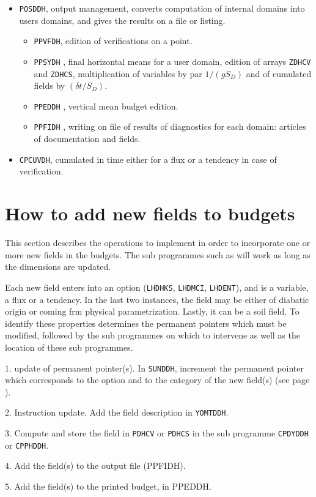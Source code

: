 \begin{itemize}
        \item {\tt POSDDH}, output management, converts computation of internal domains  into users domains, and gives the results on a file or listing.
            \begin{itemize}
                  \item {\tt PPVFDH}, edition of verifications on a point. 
                  \item {\tt PPSYDH} , final horizontal means for a user domain, edition of arrays {\tt ZDHCV} and {\tt ZDHCS}, multiplication of variables by par $1/(g S_{D})$ and of cumulated fields by $(\delta t/S_{D})$.
                  \item {\tt PPEDDH} , vertical mean budget edition.
                  \item {\tt PPFIDH} , writing on file of results of
                  diagnostics for each domain: articles of documentation and fields.
           \end{itemize}
\item {\tt CPCUVDH}, cumulated in time either for a flux or a tendency in case of verification.
\end{itemize}
\newpage

\section{How to add new fields to budgets}
This section describes the operations to implement in order to incorporate one or more new fields in the budgets. The sub programmes such as  will work as long as the dimensions are updated.

Each new field enters into an option ({\tt LHDHKS}, {\tt LHDMCI}, {\tt LHDENT}), and is a variable, a flux or a tendency. In the last two instances, the field may be either of diabatic origin or coming frm physical parametrization. Lastly, it can be a soil field. To identify these properties determines the permanent pointers which must be modified, followed by the sub programmes on which to intervene as well as the location of these sub programmes. 
\begin{description}
	\item{1. } update of permanent pointer(s). In {\tt SUNDDH}, increment the
	permanent pointer which corresponds to the option and to the category of the
	new field(s) (see page \pageref{poil}).
	\item{2. } Instruction update.
	Add the field description in {\tt YOMTDDH}.
	 \item{3.} Compute and store the field in {\tt PDHCV} or {\tt PDHCS} in the
	 sub programme {\tt CPDYDDH} or {\tt CPPHDDH}.
	\item{4. } Add the field(s) to the output file (PPFIDH).
	\item{5.} Add the field(s) to the printed budget, in PPEDDH.
\end{description}

